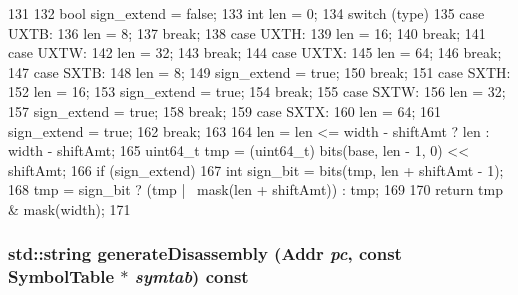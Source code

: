 \begin{DoxyCode}
131 {
132     bool sign_extend = false;
133     int len = 0;
134     switch (type) {
135       case UXTB:
136         len = 8;
137         break;
138       case UXTH:
139         len = 16;
140         break;
141       case UXTW:
142         len = 32;
143         break;
144       case UXTX:
145         len = 64;
146         break;
147       case SXTB:
148         len = 8;
149         sign_extend = true;
150         break;
151       case SXTH:
152         len = 16;
153         sign_extend = true;
154         break;
155       case SXTW:
156         len = 32;
157         sign_extend = true;
158         break;
159       case SXTX:
160         len = 64;
161         sign_extend = true;
162         break;
163     }
164     len = len <= width - shiftAmt ? len : width - shiftAmt;
165     uint64_t tmp = (uint64_t) bits(base, len - 1, 0) << shiftAmt;
166     if (sign_extend) {
167         int sign_bit = bits(tmp, len + shiftAmt - 1);
168         tmp = sign_bit ? (tmp | ~mask(len + shiftAmt)) : tmp;
169     }
170     return tmp & mask(width);
171 }
\end{DoxyCode}
\hypertarget{classArmISA_1_1ArmStaticInst_a95d323a22a5f07e14d6b4c9385a91896}{
\subsubsection[{generateDisassembly}]{\setlength{\rightskip}{0pt plus 5cm}std::string generateDisassembly ({\bf Addr} {\em pc}, \/  const SymbolTable $\ast$ {\em symtab}) const}}
\label{classArmISA_1_1ArmStaticInst_a95d323a22a5f07e14d6b4c9385a91896}


